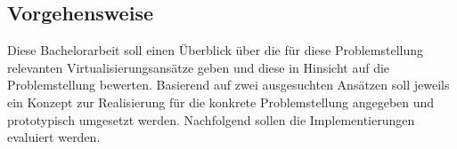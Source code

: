\subsection{Vorgehensweise}

Diese Bachelorarbeit soll einen Überblick über die für diese Problemstellung relevanten Virtualisierungsansätze geben und diese in Hinsicht auf die Problemstellung bewerten. Basierend auf zwei ausgesuchten Ansätzen soll jeweils ein Konzept zur Realisierung für die konkrete Problemstellung angegeben und prototypisch umgesetzt werden. Nachfolgend sollen die Implementierungen evaluiert werden.

